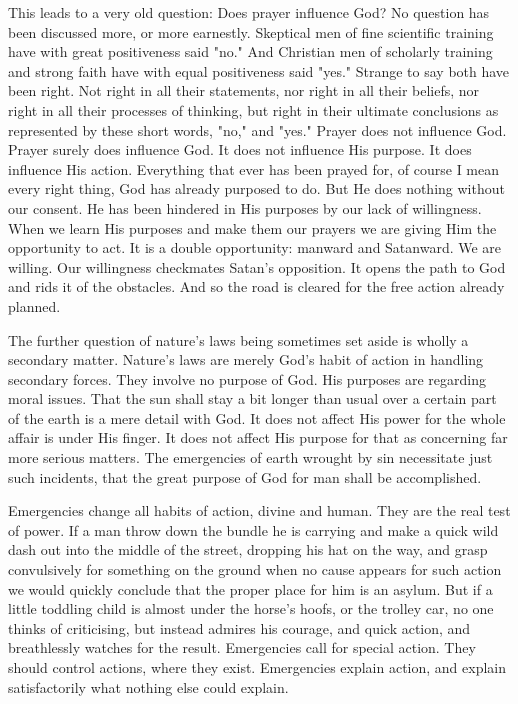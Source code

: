 This leads to a very old question: Does prayer influence God? No question
has been discussed more, or more earnestly. Skeptical men of fine
scientific training have with great positiveness said "no." And Christian
men of scholarly training and strong faith have with equal positiveness
said "yes." Strange to say both have been right. Not right in all their
statements, nor right in all their beliefs, nor right in all their
processes of thinking, but right in their ultimate conclusions as
represented by these short words, "no," and "yes." Prayer does not
influence God. Prayer surely does influence God. It does not influence His
purpose. It does influence His action. Everything that ever has been
prayed for, of course I mean every right thing, God has already purposed
to do. But He does nothing without our consent. He has been hindered in
His purposes by our lack of willingness. When we learn His purposes and
make them our prayers we are giving Him the opportunity to act. It is a
double opportunity: manward and Satanward. We are willing. Our willingness
checkmates Satan's opposition. It opens the path to God and rids it of the
obstacles. And so the road is cleared for the free action already planned.

The further question of nature's laws being sometimes set aside is wholly
a secondary matter. Nature's laws are merely God's habit of action in
handling secondary forces. They involve no purpose of God. His purposes
are regarding moral issues. That the sun shall stay a bit longer than
usual over a certain part of the earth is a mere detail with God. It does
not affect His power for the whole affair is under His finger. It does not
affect His purpose for that as concerning far more serious matters. The
emergencies of earth wrought by sin necessitate just such incidents, that
the great purpose of God for man shall be accomplished.

Emergencies change all habits of action, divine and human. They are the
real test of power. If a man throw down the bundle he is carrying and make
a quick wild dash out into the middle of the street, dropping his hat on
the way, and grasp convulsively for something on the ground when no cause
appears for such action we would quickly conclude that the proper place
for him is an asylum. But if a little toddling child is almost under the
horse's hoofs, or the trolley car, no one thinks of criticising, but
instead admires his courage, and quick action, and breathlessly watches
for the result. Emergencies call for special action. They should control
actions, where they exist. Emergencies explain action, and explain
satisfactorily what nothing else could explain.

